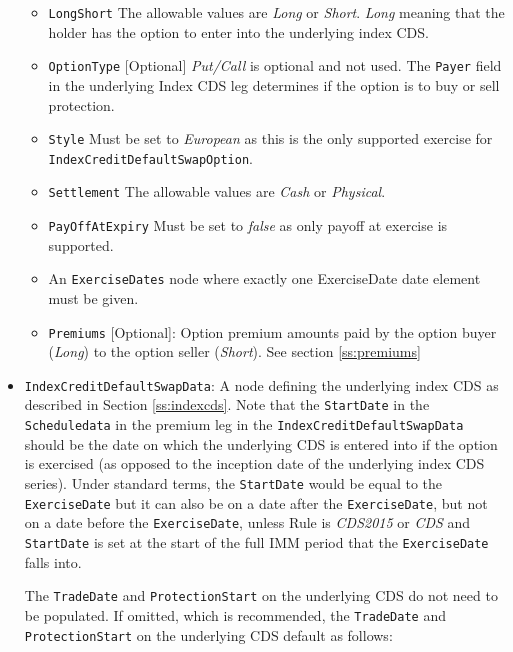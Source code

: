\begin{itemize}
\begin{itemize}
\item \lstinline!LongShort! The allowable values are \emph{Long} or \emph{Short}. \emph{Long} meaning that the holder has the option to enter into the underlying index CDS.

\item \lstinline!OptionType! [Optional] \emph{Put/Call} is optional and not used. The \lstinline!Payer! field in the underlying Index CDS leg  determines if the option is to buy or sell protection.

\item  \lstinline!Style!  Must be set to \emph{European} as this is the only supported exercise for \lstinline!IndexCreditDefaultSwapOption!. 

\item  \lstinline!Settlement! The allowable values are \emph{Cash} or \emph{Physical}.

\item \lstinline!PayOffAtExpiry! Must be set to \emph{false} as only payoff at exercise is supported.

\item An \lstinline!ExerciseDates! node where exactly one ExerciseDate date element must be given. 

\item  \lstinline!Premiums! [Optional]: Option premium amounts paid by the option buyer (\emph{Long}) to the option seller (\emph{Short}). See section \ref{ss:premiums}

\end{itemize}


\item
\lstinline!IndexCreditDefaultSwapData!: A node defining the underlying index CDS as described in Section \ref{ss:indexcds}. Note that the \lstinline!StartDate! in the \lstinline!Scheduledata! in the premium leg in the \lstinline!IndexCreditDefaultSwapData! should be the date on which the underlying CDS is entered into if the option is exercised (as opposed to the inception date of the underlying index CDS series). Under standard terms, the \lstinline!StartDate! would be equal to the \lstinline!ExerciseDate! but it can also be on a date after the \lstinline!ExerciseDate!, but not on a date before the  \lstinline!ExerciseDate!, unless Rule is \emph{CDS2015} or \emph{CDS} and \lstinline!StartDate! is set at the start of the full IMM period that the \lstinline!ExerciseDate! falls into. 

The \lstinline!TradeDate! and \lstinline!ProtectionStart! on the underlying CDS do not need to be populated. If omitted, which is recommended, the \lstinline!TradeDate! and \lstinline!ProtectionStart! on the underlying CDS default as follows:


\end{itemize}
